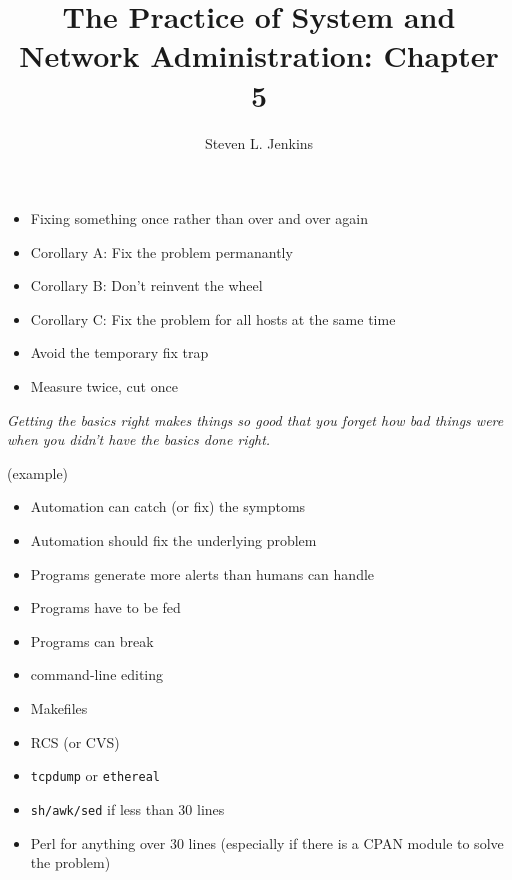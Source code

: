 \documentclass{slides}
\title{The Practice of System and Network Administration: Chapter 5}
\author{Steven L. Jenkins}
\newcommand{\bi}{\begin{itemize}}
\newcommand{\ei}{\end{itemize}}
\begin{document}

\bi
\item Fixing something once rather than over and over again
\item Corollary A: Fix the problem permanantly
\item Corollary B: Don't reinvent the wheel
\item Corollary C: Fix the problem for all hosts at the same time
\item Avoid the temporary fix trap
\item Measure twice, cut once
\ei


\emph{Getting the basics right makes things so good that you forget how 
bad things were when you didn't have the basics done right.}


(example)

\bi
\item Automation can catch (or fix) the symptoms
\item Automation should fix the underlying problem
\ei


\bi
\item Programs generate more alerts than humans can  handle
\item Programs have to be fed
\item Programs can break
\ei


\bi
\item command-line editing
\item Makefiles
\item RCS (or CVS)
\item {\tt tcpdump} or {\tt ethereal}
\item {\tt sh/awk/sed} if less than 30 lines
\item Perl for anything over 30 lines (especially if there
	is a CPAN module to solve the problem)
\ei
\end{document}
